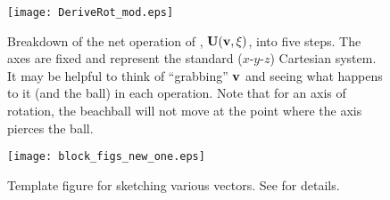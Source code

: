 \documentclass[11pt,titlepage,fleqn]{article}
\newcommand{\rotangB}{\xi}    %
\newcommand{\rotvec}{\bv}      %
\begin{document}
\clearpage\pagebreak
\begin{figure}
\centering
\texttt{[image: DeriveRot\_mod.eps]}
\caption[]
{{
Breakdown of the net operation of , $\bU(\rotvec,\rotangB)$, into five steps.
The axes are fixed and represent the standard ($x$-$y$-$z$) Cartesian system. It may be helpful to think of ``grabbing'' $\rotvec$ and seeing what happens to it (and the ball) in each operation. Note that for an axis of rotation, the beachball will not move at the point where the axis pierces the ball.
\label{fig:rot}
}}
\end{figure}

\clearpage\pagebreak


\begin{figure}
\centering
\texttt{[image: block\_figs\_new\_one.eps]}
\caption[]
{{
Template figure for sketching various vectors.
See  for details.
\label{fig:block}
}}
\end{figure}

\end{document}

